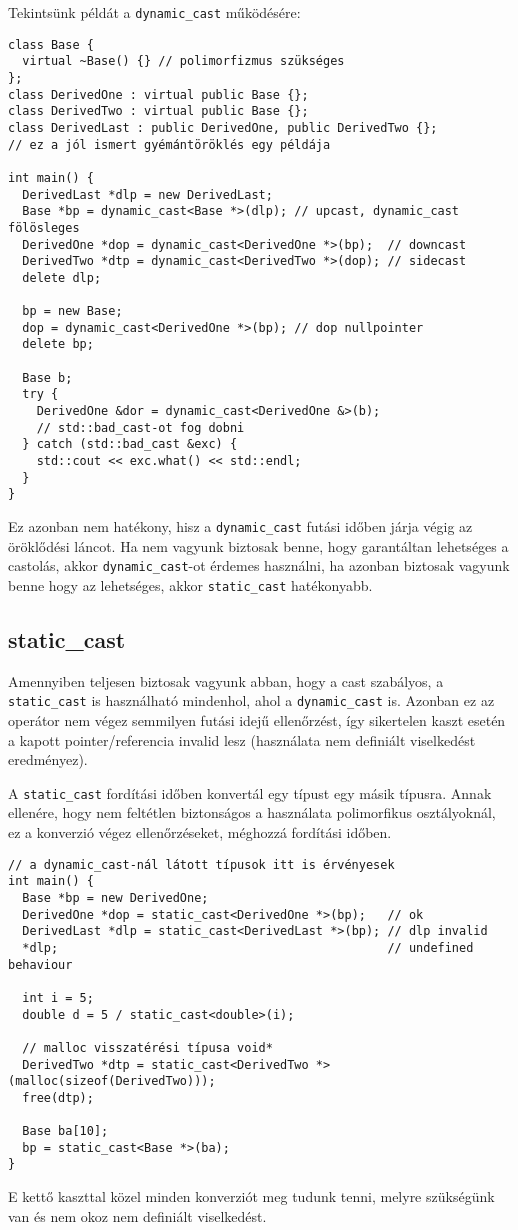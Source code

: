 \documentclass[../cpp_book/cpp_book.tex]{subfiles}
\begin{document}
	\smallskip
	Tekintsünk példát a \texttt{dynamic\_cast} működésére:
	\begin{lstlisting}
class Base {
  virtual ~Base() {} // polimorfizmus szükséges
};
class DerivedOne : virtual public Base {};
class DerivedTwo : virtual public Base {};
class DerivedLast : public DerivedOne, public DerivedTwo {};
// ez a jól ismert gyémántöröklés egy példája

int main() {
  DerivedLast *dlp = new DerivedLast;
  Base *bp = dynamic_cast<Base *>(dlp); // upcast, dynamic_cast fölösleges
  DerivedOne *dop = dynamic_cast<DerivedOne *>(bp);  // downcast
  DerivedTwo *dtp = dynamic_cast<DerivedTwo *>(dop); // sidecast
  delete dlp;

  bp = new Base;
  dop = dynamic_cast<DerivedOne *>(bp); // dop nullpointer
  delete bp;

  Base b;
  try {
    DerivedOne &dor = dynamic_cast<DerivedOne &>(b);
    // std::bad_cast-ot fog dobni
  } catch (std::bad_cast &exc) {
    std::cout << exc.what() << std::endl;
  }
}
	\end{lstlisting}
	
	Ez azonban nem hatékony, hisz a \texttt{dynamic\_cast} futási időben járja végig az öröklődési láncot. Ha nem vagyunk biztosak benne, hogy garantáltan lehetséges a castolás, akkor \texttt{dynamic\_cast}-ot érdemes használni, ha azonban biztosak vagyunk benne hogy az lehetséges, akkor \texttt{static\_cast} hatékonyabb.
	\subsection{static\_cast}
	Amennyiben teljesen biztosak vagyunk abban, hogy a cast szabályos, a \texttt{static\_cast} is használható mindenhol, ahol a \texttt{dynamic\_cast} is. Azonban ez az operátor nem végez semmilyen futási idejű ellenőrzést, így sikertelen kaszt esetén a kapott pointer/referencia invalid lesz (használata nem definiált viselkedést eredményez).
	
	\medskip
	A \texttt{static\_cast} fordítási időben konvertál egy típust egy másik típusra. Annak ellenére, hogy nem feltétlen biztonságos a használata polimorfikus osztályoknál, ez a konverzió végez ellenőrzéseket, méghozzá fordítási időben.
	\begin{lstlisting}
// a dynamic_cast-nál látott típusok itt is érvényesek
int main() {
  Base *bp = new DerivedOne;
  DerivedOne *dop = static_cast<DerivedOne *>(bp);   // ok
  DerivedLast *dlp = static_cast<DerivedLast *>(bp); // dlp invalid
  *dlp;                                              // undefined behaviour

  int i = 5;
  double d = 5 / static_cast<double>(i);

  // malloc visszatérési típusa void*
  DerivedTwo *dtp = static_cast<DerivedTwo *>(malloc(sizeof(DerivedTwo)));
  free(dtp);

  Base ba[10];
  bp = static_cast<Base *>(ba);
}
	\end{lstlisting}
	E kettő kaszttal közel minden konverziót meg tudunk tenni, melyre szükségünk van és nem okoz nem definiált viselkedést.
\end{document}
